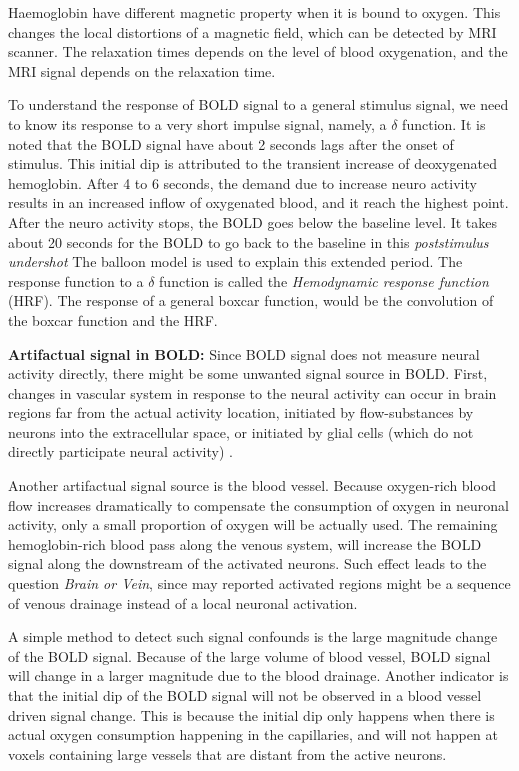 \documentclass[12pt]{article}
\begin{document}
Haemoglobin have different magnetic property when it is bound to oxygen. This
changes the local distortions of a magnetic field, which can be detected by MRI
scanner. The relaxation times depends on the level of blood oxygenation, and the
MRI signal depends on the relaxation time.

To understand the response of BOLD signal to a general stimulus signal, we need
to know its response to a very short impulse signal, namely, a $\delta$
function. It is noted that the BOLD signal have about 2 seconds lags after the
onset of stimulus. This initial dip is attributed to the transient increase of
deoxygenated hemoglobin. After 4 to 6 seconds, the demand due to increase neuro
activity results in an increased inflow of oxygenated blood, and it reach the
highest point. After the neuro activity stops, the BOLD goes below the baseline
level. It takes about 20 seconds for the BOLD to go back to the baseline in this
\emph{poststimulus undershot} The balloon model \citep{buxton1998dynamics} is
used to explain this extended period. The response function to a $\delta$
function is called the \emph{Hemodynamic response function} (HRF). The response
of a general boxcar function, would be the convolution of the boxcar function
and the HRF.

\textbf{Artifactual signal in BOLD:} Since BOLD signal does not measure neural
activity directly, there might be some unwanted signal source in BOLD. First,
changes in vascular system in response to the neural activity can occur in brain
regions far from the actual activity location, initiated by flow-substances by
neurons into the extracellular space, or initiated by glial cells (which do not
directly participate neural activity)
\citep{huettel2004functional,noll2001primer}.

Another artifactual signal source is the blood vessel. Because oxygen-rich blood
flow increases dramatically to compensate the consumption of oxygen in neuronal
activity, only a small proportion of oxygen will be actually used. The
remaining hemoglobin-rich blood pass along the venous system, will increase the
BOLD signal along the downstream of the activated neurons. Such effect leads to
the question \emph{Brain or Vein}, since may reported activated regions might be
a sequence of venous drainage instead of a local neuronal activation.

A simple method to detect such signal confounds is the large magnitude change of the BOLD signal. Because of the large volume of blood vessel, BOLD signal will change in a larger magnitude due to the blood drainage. Another indicator is that the initial dip of the BOLD signal will not be observed in a blood vessel driven signal change. This is because the initial dip only happens when there is actual oxygen consumption happening in the capillaries, and will not happen at voxels containing large vessels that are distant from the active neurons. 
\end{document}
